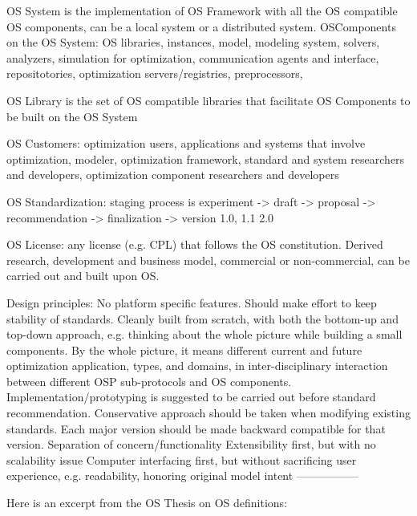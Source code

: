 \documentclass[11pt]{amsart}
\begin{document}
OS System is the implementation of OS Framework with all the OS compatible OS components, can be a local system or a distributed system.
OSComponents on the OS System: OS libraries, instances, model, modeling system, solvers, analyzers, simulation for optimization, communication agents and interface, repositotories, optimization servers/registries, preprocessors,

OS Library is the set of OS compatible libraries that facilitate OS Components to be built on the OS System

OS Customers: optimization users, applications and systems that involve optimization, modeler,  optimization framework, standard and system researchers and developers, optimization component researchers and developers

OS Standardization: staging process is experiment -> draft -> proposal -> recommendation -> finalization -> version 1.0, 1.1 2.0

OS License: any license (e.g. CPL) that follows the OS constitution. Derived research, development and business model, commercial or non-commercial, can be carried out and built upon OS.

Design principles:
No platform specific features.
Should make effort to keep stability of standards.
Cleanly built from scratch, with both the bottom-up and top-down approach, e.g. thinking about the whole picture while building a small components.
By the whole picture, it means different current and future optimization application, types, and domains, in inter-disciplinary interaction between different OSP sub-protocols and OS components.
Implementation/prototyping is suggested to be carried out before standard recommendation.
Conservative approach should be taken when modifying existing standards. Each major version should be made backward compatible for that version.
Separation of concern/functionality
Extensibility first, but with no scalability issue
Computer interfacing first, but without sacrificing user experience, e.g. readability, honoring original model intent
-----------------

Here is an excerpt from the OS Thesis on OS definitions:
\end{document}
